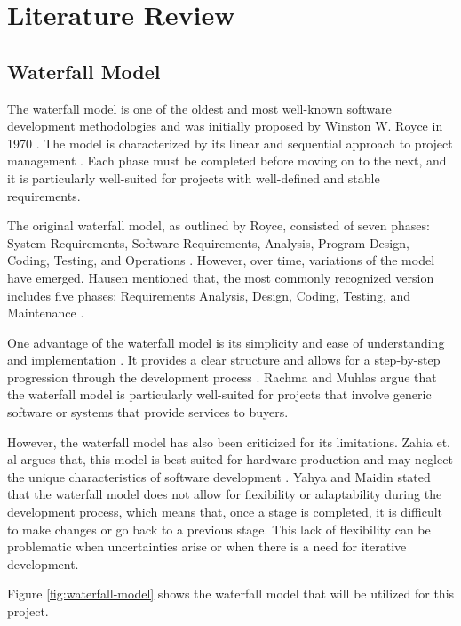 \chapter{Literature Review}
\label{chapter:literature-review}

\section{Waterfall Model}
\label{sec:waterfall-model}

The waterfall model is one of the oldest and most well-known software development methodologies and was initially proposed by Winston W. Royce in 1970 \cite{royce70}. The model is characterized by its linear and sequential approach to project management \cite{Novianti2023}. Each phase must be completed before moving on to the next, and it is particularly well-suited for projects with well-defined and stable requirements.

The original waterfall model, as outlined by Royce, consisted of seven phases: System Requirements, Software Requirements, Analysis, Program Design, Coding, Testing, and Operations \cite{royce70}.  However, over time, variations of the model have emerged. Hausen \cite{Hausen} mentioned that, the most commonly recognized version includes five phases: Requirements Analysis, Design, Coding, Testing, and Maintenance .

One advantage of the waterfall model is its simplicity and ease of understanding and implementation \cite{Sunardi2020}. It provides a clear structure and allows for a step-by-step progression through the development process \cite{Sunardi2020}. Rachma and Muhlas \cite{Rachma2022} argue that the waterfall model is particularly well-suited for projects that involve generic software or systems that provide services to buyers.

However, the waterfall model has also been criticized for its limitations. Zahia et. al \cite{Zahia14} argues that, this model is best suited for hardware production and may neglect the unique characteristics of software development . Yahya and Maidin \cite{Yahya2023} stated that the waterfall model does not allow for flexibility or adaptability during the development process, which means that, once a stage is completed, it is difficult to make changes or go back to a previous stage. This lack of flexibility can be problematic when uncertainties arise or when there is a need for iterative development.

Figure \ref{fig:waterfall-model} shows the waterfall model that will be utilized for this project.

